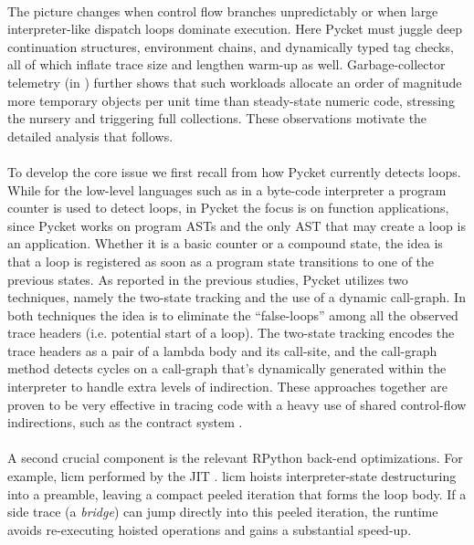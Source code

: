 	\paragraph{}%
		The picture changes when control flow branches unpredictably or when large interpreter-like dispatch loops dominate execution. Here Pycket must juggle deep continuation structures, environment chains, and dynamically typed tag checks, all of which inflate trace size and lengthen warm-up as well. Garbage-collector telemetry (in ) further shows that such workloads allocate an order of magnitude more temporary objects per unit time than steady-state numeric code, stressing the nursery and triggering full collections. These observations motivate the detailed analysis that follows.

	\paragraph{}%
		To develop the core issue we first recall from  how Pycket currently detects loops. While for the low-level languages such as in a byte-code interpreter a program counter is used to detect loops, in Pycket the focus is on function applications, since Pycket works on program ASTs and the only AST that may create a loop is an application. Whether it is a basic counter or a compound state, the idea is that a loop is registered as soon as a program state transitions to one of the previous states. As reported in the previous studies, Pycket utilizes two techniques, namely the two-state tracking and the use of a dynamic call-graph. In both techniques the idea is to eliminate the “false-loops” among all the observed trace headers (i.e. potential start of a loop). The two-state tracking encodes the trace headers as a pair of a lambda body and its call-site, and the call-graph method detects cycles on a call-graph that's dynamically generated within the interpreter to handle extra levels of indirection. These approaches together are proven to be very effective in tracing code with a heavy use of shared control-flow indirections, such as the contract system \cite{pycketmain,pycketmain2}.

	\paragraph{}%
		A second crucial component is the relevant RPython back-end optimizations. For example, \gls{licm} performed by the JIT \cite{loop-aware:12}. \gls{licm} hoists interpreter-state destructuring into a preamble, leaving a compact peeled iteration that forms the loop body. If a side trace (a \emph{bridge}) can jump directly into this peeled iteration, the runtime avoids re-executing hoisted operations and gains a substantial speed-up.

